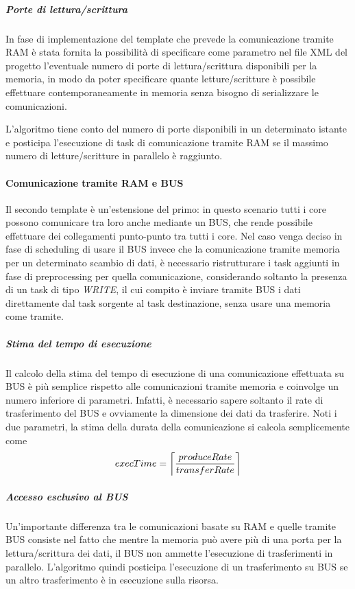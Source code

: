 \subparagraph{Porte di lettura/scrittura}
In fase di implementazione del template che prevede la comunicazione tramite 
\acs{RAM} è stata fornita la possibilità di specificare come parametro nel file 
XML del progetto l'eventuale numero di porte di lettura/scrittura disponibili 
per la memoria, in modo da poter specificare quante letture/scritture è 
possibile effettuare contemporaneamente in memoria senza bisogno di 
serializzare le comunicazioni.

L'algoritmo tiene conto del numero di porte disponibili in un determinato istante
e posticipa l'esecuzione di task di comunicazione tramite \acs{RAM} se il
massimo numero di letture/scritture in parallelo è raggiunto.


\paragraph{Comunicazione tramite \acs{RAM} e BUS}
Il secondo template è un'estensione del primo: in questo scenario tutti i 
core possono comunicare tra loro anche mediante un BUS, che rende possibile 
effettuare dei collegamenti punto-punto tra tutti i core. Nel caso venga deciso 
in fase di scheduling di usare il BUS invece che la comunicazione tramite 
memoria per un determinato scambio di dati, è necessario ristrutturare i task 
aggiunti in fase di preprocessing per quella comunicazione, considerando 
soltanto la presenza di un task di tipo \emph{WRITE}, il cui compito è inviare 
tramite BUS i dati direttamente dal task sorgente al task destinazione,
senza usare una memoria come tramite.

\subparagraph{Stima del tempo di esecuzione}
Il calcolo della stima del tempo di esecuzione di una comunicazione effettuata 
su BUS è più semplice rispetto alle comunicazioni tramite memoria e coinvolge 
un numero inferiore di parametri. Infatti, è necessario sapere soltanto il rate 
di trasferimento del BUS e ovviamente la dimensione dei dati da trasferire. 
Noti i due parametri, la stima della durata della comunicazione si calcola 
semplicemente come
\begin{equation}
 execTime = \ceil[\bigg]{\frac{produceRate}{transferRate}}
\end{equation}

\subparagraph{Accesso esclusivo al BUS}
Un'importante differenza tra le comunicazioni basate su \acs{RAM} e quelle 
tramite BUS consiste nel fatto che mentre la memoria può avere più di una porta 
per la lettura/scrittura dei dati, il BUS non ammette l'esecuzione 
di trasferimenti in parallelo. L'algoritmo quindi posticipa l'esecuzione di un 
trasferimento su BUS se un altro trasferimento è in esecuzione sulla risorsa.



